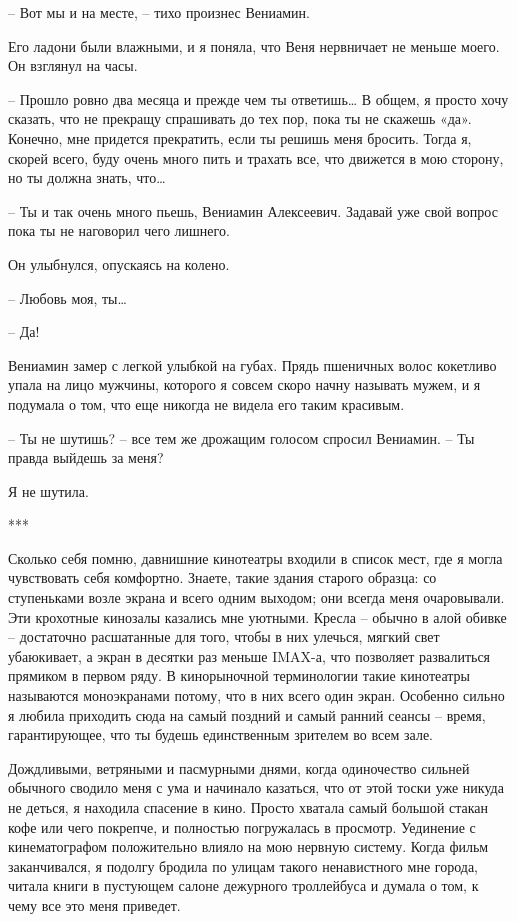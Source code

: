 \documentclass[
]{book}
\begin{document}
-- Вот мы и на месте, -- тихо произнес Вениамин.

Его ладони были влажными, и я поняла, что Веня нервничает не меньше моего. Он взглянул на часы.

-- Прошло ровно два месяца и прежде чем ты ответишь\ldots{} В общем, я просто хочу сказать, что не прекращу спрашивать до тех пор, пока ты не скажешь «да». Конечно, мне придется прекратить, если ты решишь меня бросить. Тогда я, скорей всего, буду очень много пить и трахать все, что движется в мою сторону, но ты должна знать, что\ldots{}

-- Ты и так очень много пьешь, Вениамин Алексеевич. Задавай уже свой вопрос пока ты не наговорил чего лишнего.

Он улыбнулся, опускаясь на колено.

-- Любовь моя, ты\ldots{}

-- Да!

Вениамин замер с легкой улыбкой на губах. Прядь пшеничных волос кокетливо упала на лицо мужчины, которого я совсем скоро начну называть мужем, и я подумала о том, что еще никогда не видела его таким красивым.

-- Ты не шутишь? -- все тем же дрожащим голосом спросил Вениамин. -- Ты правда выйдешь за меня?

Я не шутила.

***

Сколько себя помню, давнишние кинотеатры входили в список мест, где я могла чувствовать себя комфортно. Знаете, такие здания старого образца: со ступеньками возле экрана и всего одним выходом; они всегда меня очаровывали. Эти крохотные кинозалы казались мне уютными. Кресла -- обычно в алой обивке -- достаточно расшатанные для того, чтобы в них улечься, мягкий свет убаюкивает, а экран в десятки раз меньше IMAX-а, что позволяет развалиться прямиком в первом ряду. В кинорыночной терминологии такие кинотеатры называются моноэкранами потому, что в них всего один экран. Особенно сильно я любила приходить сюда на самый поздний и самый ранний сеансы -- время, гарантирующее, что ты будешь единственным зрителем во всем зале.

Дождливыми, ветряными и пасмурными днями, когда одиночество сильней обычного сводило меня с ума и начинало казаться, что от этой тоски уже никуда не деться, я находила спасение в кино. Просто хватала самый большой стакан кофе или чего покрепче, и полностью погружалась в просмотр. Уединение с кинематографом положительно влияло на мою нервную систему. Когда фильм заканчивался, я подолгу бродила по улицам такого ненавистного мне города, читала книги в пустующем салоне дежурного троллейбуса и думала о том, к чему все это меня приведет.
\end{document}
